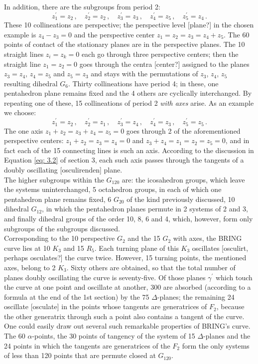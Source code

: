 \documentclass[leqno]{article}
\begin{document}
In addition, there are the subgroups from period 2:
\[
z_1^\prime = z_2 \, , \quad z_2^\prime = z_2 \, , \quad z_3^\prime = z_3 \, , \quad z_4^\prime = z_5 \, , \quad z_5^\prime = z_4 \, . 
\]
These 10 collineations are perspective; the perspective level [plane?] in the chosen example is $z_4 - z_3 = 0$ and the perspective center $z_1 = z_2 = z_3 = z_4+z_5$. The 60 points of contact of the stationary planes are in the perspective planes. The 10 straight lines $z_i=z_k=0$ each go through three perspective centers; then the straight line $z_1 = z_2 = 0$ goes through the centra [center?] assigned to the planes $z_3=z_4$, $z_4=z_5$ and $z_5 = z_3$ and stays with the permutations of $z_3$, $z_4$, $z_5$ resulting dihedral $G_6$. Thirty collineations have period 4; in these, one pentahedron plane remains fixed and the 4 others are cyclically interchanged. By repeating one of these, 15 collineations of period 2 \emph{with axes} arise. As an example we choose:
\[
z_1^\prime = z_2 \, , \quad z_2^\prime = z_1 \, , \quad z_3^\prime = z_4 \, , \quad z_4^\prime = z_3 \, , \quad z_5^\prime = z_5 \, . 
\]
The one axis $z_1 + z_2 = z_3 + z_4 = z_5 = 0$ goes through 2 of the aforementioned perspective centers: $z_1 +z_2 = z_3 = z_4 = 0$ and $z_3 + z_4 = z_1 = z_2 = z_5=0$, and in fact each of the 15 connecting lines is such an axis. According to the discussion in Equation \eqref{eq: 3.2} of section 3, each such axis passes through the tangents of a doubly oscillating [osculirenden] plane. \\
The higher subgroups within the $G_{120}$ are: the icosahedron groups, which leave the systems uninterchanged, 5 octahedron groups, in each of which one pentahedron plane remains fixed, 6 $G_{20}$ of the kind previously discussed, 10 dihedral $G_{ 12}$, in which the pentahedron planes permute in 2 systems of 2 and 3, and finally dihedral groups of the order 10, 8, 6 and 4, which, however, form only subgroups of the subgroups discussed. \\
Corresponding to the 10 perspective $G_2$ and the 15 $G_2$ with axes, the BRING curve lies at 10 $K_3$ and 15 $R_5$. Each turning plane of this $K_3$ oscillates [osculirt, perhaps osculates?] the curve twice. However, 15 turning points, the mentioned axes, belong to 2 $K_3$. Sixty others are obtained, so that the total number of planes doubly oscillating the curve is seventy-five. Of those planes $\gamma^\prime$ which touch the curve at one point and oscillate at another, 300 are absorbed (according to a formula at the end of the 1st section) by the 75 $\Delta$-planes; the remaining 24 oscillate [osculate] in the points whose tangents are generatrices of $F_2$, because the other generatrix through such a point also contains a tangent of the curve. One could easily draw out several such remarkable properties of BRING's curve. \\
The 60 $\alpha$-points, the 30 points of tangency of the system of 15 $\Delta$-planes and the 24 points in which the tangents are generatrices of the $F_2$ form the only systems of less than 120 points that are permute closed at $G_{120}$.
\end{document}
